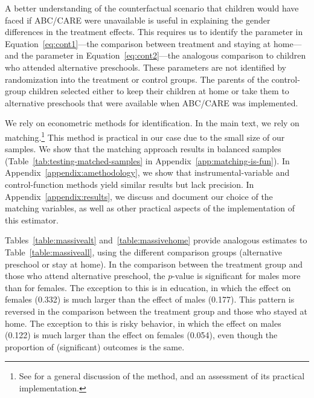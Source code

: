 A better understanding of the counterfactual scenario that children would have faced if ABC/CARE were unavailable is useful in explaining the gender differences in the treatment effects. This requires us to identify the parameter in Equation~\eqref{eq:cont1}---the comparison between treatment and staying at home---and the parameter in Equation~\eqref{eq:cont2}---the analogous comparison to children who attended alternative preschools. These parameters are not identified by randomization into the treatment or control groups. The parents of the control-group children selected either to keep their children at home or take them to alternative preschools that were available when ABC/CARE was implemented. 

We rely on econometric methods for identification. In the main text, we rely on matching.\footnote{See \citet{Heckman_Ichimura_etal_1998_REStud} for a general discussion of the method, and an assessment of its practical implementation.} This method is practical in our case due to the small size of our samples. We show that the matching approach results in balanced samples (Table~\ref{tab:testing-matched-samples} in Appendix~\ref{app:matching-is-fun}). In Appendix~\ref{appendix:amethodology}, we show that instrumental-variable and control-function methods yield similar results but lack precision. In Appendix~\ref{appendix:results}, we discuss and document our choice of the matching variables, as well as other practical aspects of the implementation of this estimator.


Tables~\ref{table:massivealt} and~\ref{table:massivehome} provide analogous estimates to Table~\ref{table:massiveall}, using the different comparison groups (alternative preschool or stay at home). In the comparison between the treatment group and those who attend alternative preschool, the  \citet{Rosenbaum_2005_Distribution_JRSS} $p$-value is significant for males more than for females. The exception to this is in education, in which the effect on females (0.332) is much larger than the effect of males (0.177). This pattern is reversed in the comparison between the treatment group and those who stayed at home. The exception to this is risky behavior, in which the effect on males (0.122) is much larger than the effect on females (0.054), even though the proportion of (significant) outcomes is the same. 


